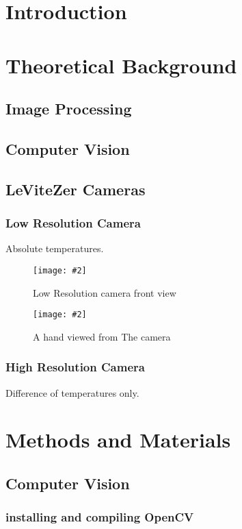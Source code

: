 \documentclass[hidelinks,11pt,a4paper,oneside,article]{memoir}
\newcommand{\putimage}[3][10] %
{
    \begin{figure}[h]
        \centering
        \captionsetup{justification=centering}
        \texttt{[image: \#2]}
        \caption{#3}
        \label{fig:#2}
    \end{figure}
}
\begin{document}
	\setcounter{page}{1} %
	\ClearWallPaper
	
	\sloppy %
	
	\chapter{Introduction}
    
    \clearpage	
	\chapter{Theoretical Background}
    \section{Image Processing}
    \section{Computer Vision}
    \section{LeViteZer Cameras}
    \subsection{Low Resolution Camera}
    Absolute temperatures.
    \putimage{low-resolution}{Low Resolution camera front view}
    \putimage{hand}{A hand viewed from The camera}
    \subsection{High Resolution Camera}
    Difference of temperatures only.
    
    \clearpage
	\chapter{Methods and Materials}
    \section{Computer Vision}
    \subsection{installing and compiling OpenCV}
\end{document}
